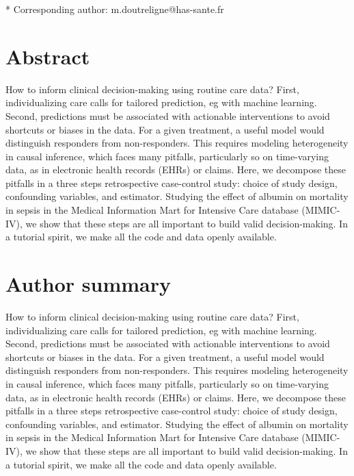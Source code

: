 \documentclass[10pt,letterpaper]{article}
\begin{document}
\begin{flushleft}



    * Corresponding author: m.doutreligne@has-sante.fr

\end{flushleft}
\section*{Abstract}
How to inform clinical decision-making using routine care data? First,
individualizing care calls for tailored prediction, eg with machine learning.
Second, predictions must be associated with actionable interventions to avoid
shortcuts or biases in the data. For a given treatment, a useful model would
distinguish responders from non-responders. This requires modeling
heterogeneity in causal inference, which faces many pitfalls, particularly so
on time-varying data, as in electronic health records (EHRs) or claims. Here,
we decompose these pitfalls in a three steps retrospective case-control study: choice of study design,
confounding variables, and estimator. Studying the effect of albumin on
mortality in sepsis in the Medical Information Mart for Intensive Care
database (MIMIC-IV), we show that these steps are all important to build valid
decision-making. In a tutorial spirit, we make all the code and data openly
available.

\section*{Author summary}
How to inform clinical decision-making using routine care data? First,
individualizing care calls for tailored prediction, eg with machine learning.
Second, predictions must be associated with actionable interventions to avoid
shortcuts or biases in the data. For a given treatment, a useful model would
distinguish responders from non-responders. This requires modeling
heterogeneity in causal inference, which faces many pitfalls, particularly so
on time-varying data, as in electronic health records (EHRs) or claims. Here,
we decompose these pitfalls in a three steps retrospective case-control study: choice of study design,
confounding variables, and estimator. Studying the effect of albumin on
mortality in sepsis in the Medical Information Mart for Intensive Care
database (MIMIC-IV), we show that these steps are all important to build valid
decision-making. In a tutorial spirit, we make all the code and data openly
available.
\end{document}
